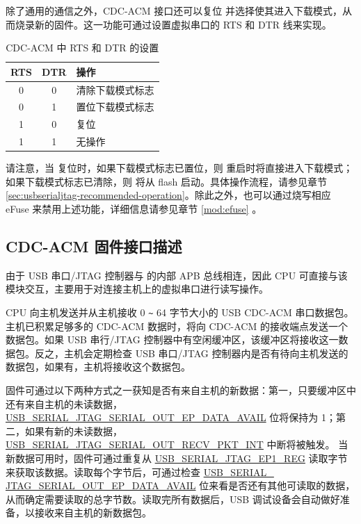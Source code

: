 \documentclass[main\_\_CN.tex]{subfiles}
\begin{document}
除了通用的通信之外，CDC-ACM 接口还可以复位 \chipname{} 并选择使其进入下载模式，从而烧录新的固件。这一功能可通过设置虚拟串口的 RTS 和 DTR 线来实现。

\begin{table}[H]
    \centering
    \caption{CDC-ACM 中 RTS 和 DTR 的设置}
    \label{tab:usbserialjtag-cdc-acm-settings-with-rts-and-dtr}

    \begin{tabular}{ | c | c | p{5cm} | }
    \hline
        \rowcolor{lightgray}
        \textbf{RTS} & \textbf{DTR} & \textbf{操作}\\\hline

        0 & 0 & 清除下载模式标志 \\\hline
        0 & 1 & 置位下载模式标志  \\\hline
        1 & 0 & 复位 \chipname{}  \\\hline
        1 & 1 & 无操作 \\\hline
    \end{tabular}
\end{table}

请注意，当 \chipname{} 复位时，如果下载模式标志已置位，则 \chipname{} 重启时将直接进入下载模式；如果下载模式标志已清除，则 \chipname{} 将从 flash 启动。具体操作流程，请参见章节 \ref{sec:usbserialjtag-recommended-operation}。除此之外，也可以通过烧写相应 eFuse 来禁用上述功能，详细信息请参见章节 \ref{mod:efuse} \textit{}。

\subsection{CDC-ACM 固件接口描述}

由于 USB 串口/JTAG 控制器与 \chipname{} 的内部 APB 总线相连，因此 CPU 可直接与该模块交互，主要用于对连接主机上的虚拟串口进行读写操作。

CPU 向主机发送并从主机接收 0 \verb+~+ 64 字节大小的 USB CDC-ACM 串口数据包。主机已积累足够多的 CDC-ACM 数据时，将向 CDC-ACM 的接收端点发送一个数据包。如果 USB 串行/JTAG 控制器中有空闲缓冲区，该缓冲区将接收这一数据包。反之，主机会定期检查 USB 串口/JTAG 控制器内是否有待向主机发送的数据包，如果有，主机将接收这个数据包。

固件可通过以下两种方式之一获知是否有来自主机的新数据：第一，只要缓冲区中还有来自主机的未读数据，\hyperref[fielddesc:USBSERIALJTAGSERIALOUTEPDATAAVAIL]{USB\_SERIAL\_JTAG\_SERIAL\_OUT\_EP\_DATA\_AVAIL} 位将保持为 1；第二，如果有新的未读数据，\\\hyperref[fielddesc:USBSERIALJTAGSERIALOUTRECVPKTINTRAW]{USB\_SERIAL\_JTAG\_SERIAL\_OUT\_RECV\_PKT\_INT} 中断将被触发。 当新数据可用时，固件可通过重复从 \hyperref[fielddesc:USBSERIALJTAGRDWRBYTE]{USB\_SERIAL\_JTAG\_EP1\_REG} 读取字节来获取该数据。读取每个字节后，可通过检查 \hyperref[fielddesc:USBSERIALJTAGSERIALOUTEPDATAAVAIL]{USB\_SERIAL\_\\JTAG\_SERIAL\_OUT\_EP\_DATA\_AVAIL} 位来看是否还有其他可读取的数据，从而确定需要读取的总字节数。读取完所有数据后，USB 调试设备会自动做好准备，以接收来自主机的新数据包。
\end{document}

